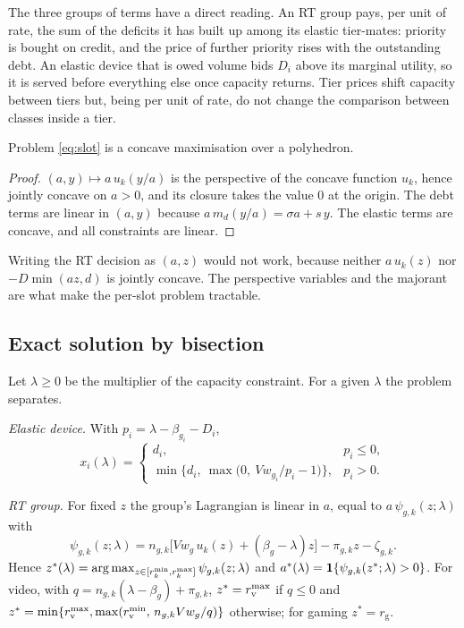 The three groups of terms have a direct reading.
An RT group pays, per unit of rate, the sum of the deficits it has built up among its elastic tier-mates: priority is bought on credit, and the price of further priority rises with the outstanding debt.
An elastic device that is owed volume bids $D_i$ above its marginal utility, so it is served before everything else once capacity returns.
Tier prices shift capacity between tiers but, being per unit of rate, do not change the comparison between classes inside a tier.

\begin{lemma}\label{lem:concave}
Problem \eqref{eq:slot} is a concave maximisation over a polyhedron.
\end{lemma}
\begin{proof}
$(a,y)\mapsto a\,u_k(y/a)$ is the perspective of the concave function $u_k$, hence jointly concave on $a>0$, and its closure takes the value $0$ at the origin.
The debt terms are linear in $(a,y)$ because $a\,m_d(y/a)=\sigma a+s\,y$.
The elastic terms are concave, and all constraints are linear.
\end{proof}

Writing the RT decision as $(a,z)$ would not work, because neither $a\,u_k(z)$ nor $-D\min(az,d)$ is jointly concave.
The perspective variables and the majorant are what make the per-slot problem tractable.

\subsection{Exact solution by bisection}

Let $\lambda\ge 0$ be the multiplier of the capacity constraint.
For a given $\lambda$ the problem separates.

\emph{Elastic device.} With $p_i=\lambda-\beta_{g_i}-D_i$,
\begin{equation}\label{eq:xresp}
x_i(\lambda)=\begin{cases}d_i, & p_i\le 0,\\
\min\big\{d_i,\ \max\big(0,\ V w_{g_i}/p_i-1\big)\big\}, & p_i>0 .\end{cases}
\end{equation}

\emph{RT group.} For fixed $z$ the group's Lagrangian is linear in $a$, equal to $a\,\psi_{g,k}(z;\lambda)$ with
\begin{equation}\label{eq:psi}
\psi_{g,k}(z;\lambda)=n_{g,k}\big[V w_g\,u_k(z)+(\beta_g-\lambda)z\big]-\pi_{g,k}z-\zeta_{g,k}.
\end{equation}
Hence $z^*(\lambda)=\arg\max_{z\in[r^{\min}_k,r^{\max}_k]}\psi_{g,k}(z;\lambda)$ and $a^*(\lambda)=\mathbf{1}\{\psi_{g,k}(z^*;\lambda)>0\}$.
For video, with $q=n_{g,k}(\lambda-\beta_g)+\pi_{g,k}$, $z^*=r^{\max}_{\mathrm{v}}$ if $q\le 0$ and $z^*=\min\{r^{\max}_{\mathrm{v}},\max(r^{\min}_{\mathrm{v}},\,n_{g,k}Vw_g/q)\}$ otherwise; for gaming $z^*=r_{\mathrm{g}}$.

